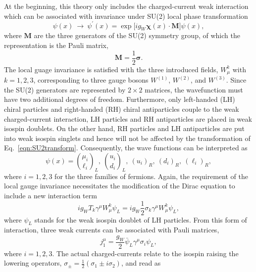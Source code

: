 At the beginning, this theory only includes the charged-current weak interaction which can be associated with invariance under SU(2) local phase transformation
\begin{equation}
\label{eqn:SU2transform}
\psi(x) \ \to\ \psi^{\prime}(x) = \exp\bigg[ig_{W}\boldsymbol{\chi}(x)\cdot\boldsymbol{M}\bigg]\psi(x),
\end{equation}
where $\boldsymbol{M}$ are the three generators of the SU(2) symmetry group, of which the representation is the Pauli matrix,
\begin{equation}
\boldsymbol{M}=\frac{1}{2}\boldsymbol{\sigma}.
\end{equation}
The local guage invariance is satisfied with the three introduced fields, $W_{\mu}^{k}$ with $k=1,2,3$, corresponding to three gauge bosons $W^{(1)}$, $W^{(2)}$, and $W^{(3)}$. Since the SU(2) generators are represented by $2\times2$ matrices, the wavefunction must have two additional degrees of freedom. 
Furthermore, only left-handed (LH) chiral particles and right-handed (RH) chiral antiparticles couple to the weak charged-current interaction, LH particles and RH antiparticles are placed in weak isospin doublets. On the other hand, RH particles and LH antiparticles are put into weak isospin singlets and hence will not be affected by the transformation of Eq.~\ref{eqn:SU2transform}. Consequently, the wave functions can be interpreted as 
\begin{equation}
\label{eqn:WeakWaveFunc}
\psi(x) = \binom{\mu_{i}}{\ell_{i}}_{L},\ \binom{u_{i}}{d_{i}}_{L},\ (u_{i})_{R},\ (d_{i})_{R},\ (\ell_{i})_{R},
\end{equation}
where $i = 1, 2, 3$ for the three families of fermions.
Again, the requirement of the local gauge invariance necessitates the modification of the Dirac equation to include a new interaction term 
\begin{equation}
\label{eqn:WeakInteraction}
ig_{W}T_{k}\gamma^{\mu}W_{\mu}^{k}\psi_{L}=ig_{W}\frac{1}{2}\sigma_{k}\gamma^{\mu}W_{\mu}^{k}\psi_{L},
\end{equation}
where $\psi_{L}$ stands for the weak isospin doublet of LH particles. 
From this form of interaction, three weak currents can be associated with Pauli matrices,
\begin{equation}
\label{eqn:WeakCurrent1}
j_{1}^{\mu}=\frac{g_{W}}{2}\bar{\psi}_{L}\gamma^{\mu}\sigma_{i}\psi_{L},
\end{equation}
where $i=1,2,3$. The actual charged-currents relate to the isospin raising the lowering operators, $\sigma_{\pm}=\frac{1}{2}(\sigma_{1}\pm i\sigma_{2})$, and read as 
